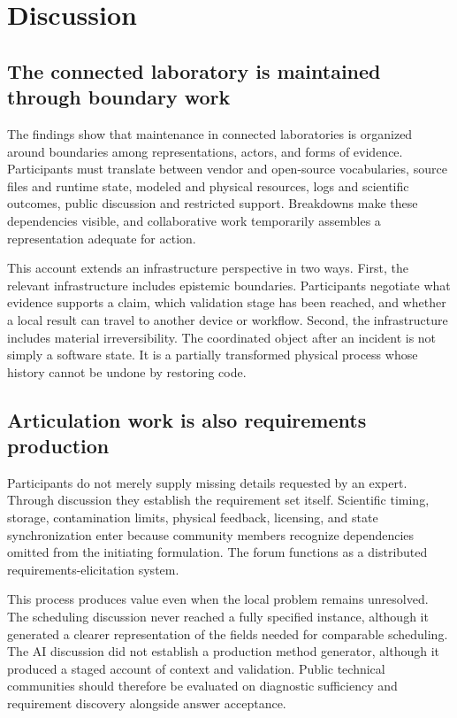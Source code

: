 \section{Discussion}

\subsection{The connected laboratory is maintained through boundary work}

The findings show that maintenance in connected laboratories is organized around boundaries among representations, actors, and forms of evidence. Participants must translate between vendor and open-source vocabularies, source files and runtime state, modeled and physical resources, logs and scientific outcomes, public discussion and restricted support. Breakdowns make these dependencies visible, and collaborative work temporarily assembles a representation adequate for action.

This account extends an infrastructure perspective in two ways. First, the relevant infrastructure includes epistemic boundaries. Participants negotiate what evidence supports a claim, which validation stage has been reached, and whether a local result can travel to another device or workflow. Second, the infrastructure includes material irreversibility. The coordinated object after an incident is not simply a software state. It is a partially transformed physical process whose history cannot be undone by restoring code.

\subsection{Articulation work is also requirements production}

Participants do not merely supply missing details requested by an expert. Through discussion they establish the requirement set itself. Scientific timing, storage, contamination limits, physical feedback, licensing, and state synchronization enter because community members recognize dependencies omitted from the initiating formulation. The forum functions as a distributed requirements-elicitation system.

This process produces value even when the local problem remains unresolved. The scheduling discussion never reached a fully specified instance, although it generated a clearer representation of the fields needed for comparable scheduling. The AI discussion did not establish a production method generator, although it produced a staged account of context and validation. Public technical communities should therefore be evaluated on diagnostic sufficiency and requirement discovery alongside answer acceptance.

